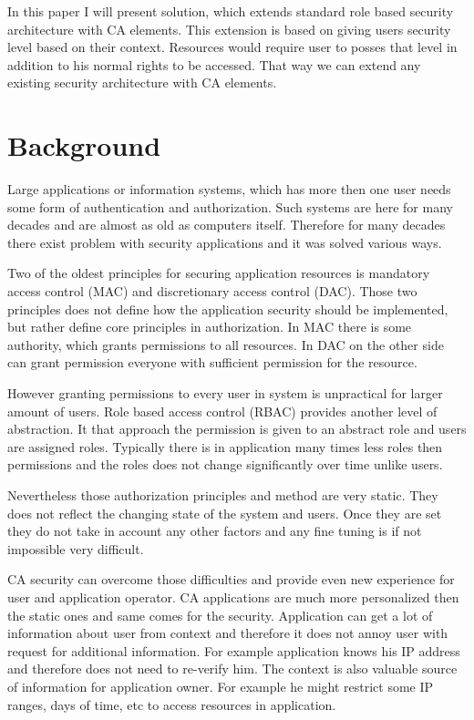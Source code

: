\documentclass{poster15}
\begin{document}
In this paper I will present solution, which extends standard role based security architecture with CA elements. This extension is based on giving users security level based on their context. Resources would require user to posses that level in addition to his normal rights to be accessed. That way we can extend any existing security architecture with CA elements.

\section{Background}

Large applications or information systems, which has more then one user needs some form of authentication and authorization. Such systems are here for many decades and are almost as old as computers itself. Therefore for many decades there exist problem with security applications and it was solved various ways.

Two of the oldest principles for securing application resources is mandatory access control (MAC) and discretionary access control (DAC). Those two principles does not define how the application security should be implemented, but rather define core principles in authorization. In MAC there is some authority, which grants permissions to all resources. In DAC on the other side can grant permission everyone with sufficient permission for the resource.

However granting permissions to every user in system is unpractical for larger amount of users. Role based access control (RBAC) provides another level of abstraction. It that approach the permission is given to an abstract role and users are assigned roles. Typically there is in application many times less roles then permissions and the roles does not change significantly over time unlike users.

Nevertheless those authorization principles and method are very static. They does not reflect the changing state of the system and users. Once they are set they do not take in account any other factors and any fine tuning is if not impossible very difficult.

CA security can overcome those difficulties and provide even new experience for user and application operator. CA applications are much more personalized then the static ones and same comes for the security. Application can get a lot of information about user from context and therefore it does not annoy user with request for additional information. For example application knows his IP address and therefore does not need to re-verify him. The context is also valuable source of information for application owner. For example he might restrict some IP ranges, days of time, etc to access resources in application. 
\end{document}
